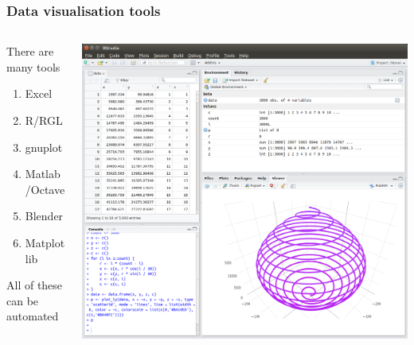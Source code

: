 \documentclass[handout, notes=hide]{beamer}
\begin{document}
\begin{frame}
\frametitle{Data visualisation tools}
\setlength{\parskip}{0.5em}

\begin{columns}[T]
\begin{column}[T]{0.45\textwidth}
\setlength{\parskip}{0.7em}
There are many tools

\begin{enumerate}
\item Excel
\item R/RGL
\item gnuplot
\item Matlab/Octave
\item Blender
\item Matplotlib
\end{enumerate}

All of these can be automated

\end{column}
\begin{column}[T]{0.55\textwidth}
\vspace{0.0em}
\includegraphics[width=1.0\textwidth]{rstudio}
\end{column}
\end{columns}


\end{frame}
\note{
\setlength{\parskip}{0.5em}
}
 
\end{document}
